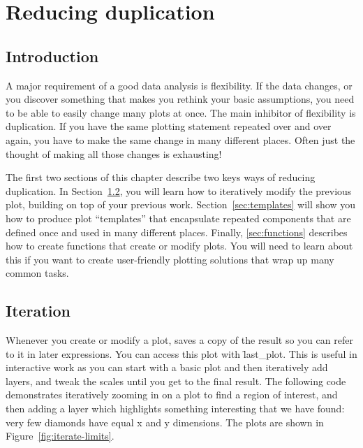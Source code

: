 

% 


\chapter{Reducing duplication}
\label{cha:duplication}

\section{Introduction}

A major requirement of a good data analysis is flexibility. If the data changes, or you discover something that makes you rethink your basic assumptions, you need to be able to easily change many plots at once. The main inhibitor of flexibility is duplication. If you have the same plotting statement repeated over and over again, you have to make the same change in many different places. Often just the thought of making all those changes is exhausting!

The first two sections of this chapter describe two keys ways of reducing duplication.  In Section~\ref{sec:iteration}, you will learn how to iteratively modify the previous plot, building on top of your previous work.  Section~\ref{sec:templates} will show you how to produce plot ``templates'' that encapsulate repeated components that are defined once and used in many different places. Finally, \ref{sec:functions} describes how to create functions that create or modify plots. You will need to learn about this if you want to create user-friendly plotting solutions that wrap up many common tasks.

\section{Iteration}
\label{sec:iteration}

Whenever you create or modify a plot, \ggplot saves a copy of the result so you can refer to it in later expressions. You can access this plot with \f{last_plot}. This is useful in interactive work as you can start with a basic plot and then iteratively add layers, and tweak the scales until you get to the final result. The following code demonstrates iteratively zooming in on a plot to find a region of interest, and then adding a layer which highlights something interesting that we have found: very few diamonds have equal x and y dimensions. The plots are shown in Figure~\ref{fig:iterate-limits}.

